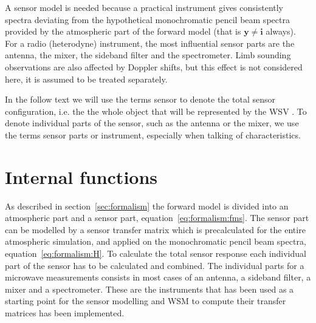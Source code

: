 %
%

A sensor model is needed because a practical instrument gives
consistently spectra deviating from the hypothetical monochromatic
pencil beam spectra provided by the atmospheric part of the forward
model (that is $\mathbf{y} \neq \mathbf{i}$ always). For a radio (heterodyne)
instrument, the most influential sensor parts are the antenna, the
mixer, the sideband filter and the spectrometer. Limb sounding
observations are also affected by Doppler shifts, but this effect is
not considered here, it is assumed to be treated separately.

In the follow text we will use the terms sensor to denote the total
sensor configuration, i.e. the the whole object that will be
represented by the WSV . To denote 
individual parts of the sensor, such as the antenna or the mixer, we
use the terms sensor parts or instrument, especially when talking
of characteristics.

\section{Internal functions}
As described in section~\ref{sec:formalism} the forward model is divided into an atmospheric
part and a sensor part, equation~\ref{eq:formalism:fms}. The sensor part can be modelled by a
sensor transfer matrix which is precalculated for the entire atmospheric simulation, and applied on the monochromatic pencil beam spectra, equation~\ref{eq:formalism:H}. To calculate the total sensor response each individual part of the sensor has to be calculated and combined.
The individual parts for a microwave measurements consists in most cases of an antenna, a sideband filter, a mixer and a spectrometer. These are the instruments that has been used as a starting point for the sensor modelling and WSM to compute their transfer matrices has been implemented.
 
